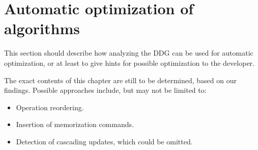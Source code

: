 \section{Automatic optimization of algorithms}
This section should describe how analyzing the DDG can be used for automatic optimization, or at least to give hints for possible optimization to the developer. 

The exact contents of this chapter are still to be determined, based on our findings. Possible approaches include, but may not be limited to: 

\begin{itemize}
\item Operation reordering.
\item Insertion of memorization commands.
\item Detection of cascading updates, which could be omitted. 
\end{itemize}